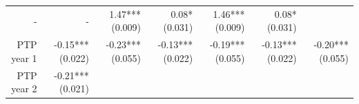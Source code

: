 \documentclass[]{article}
\begin{document}
\begin{longtable}[c]{@{}rrrrrrr@{}}
\begin{minipage}[t]{0.11\columnwidth}\raggedleft\strut
-
\strut\end{minipage} &
\begin{minipage}[t]{0.12\columnwidth}\raggedleft\strut
-
\strut\end{minipage} &
\begin{minipage}[t]{0.11\columnwidth}\raggedleft\strut
1.47*** (0.009)
\strut\end{minipage} &
\begin{minipage}[t]{0.12\columnwidth}\raggedleft\strut
0.08* (0.031)
\strut\end{minipage} &
\begin{minipage}[t]{0.11\columnwidth}\raggedleft\strut
1.46*** (0.009)
\strut\end{minipage} &
\begin{minipage}[t]{0.11\columnwidth}\raggedleft\strut
0.08* (0.031)
\strut\end{minipage}\tabularnewline
\begin{minipage}[t]{0.12\columnwidth}\raggedleft\strut
PTP year 1
\strut\end{minipage} &
\begin{minipage}[t]{0.11\columnwidth}\raggedleft\strut
-0.15*** (0.022)
\strut\end{minipage} &
\begin{minipage}[t]{0.12\columnwidth}\raggedleft\strut
-0.23*** (0.055)
\strut\end{minipage} &
\begin{minipage}[t]{0.11\columnwidth}\raggedleft\strut
-0.13*** (0.022)
\strut\end{minipage} &
\begin{minipage}[t]{0.12\columnwidth}\raggedleft\strut
-0.19*** (0.055)
\strut\end{minipage} &
\begin{minipage}[t]{0.11\columnwidth}\raggedleft\strut
-0.13*** (0.022)
\strut\end{minipage} &
\begin{minipage}[t]{0.11\columnwidth}\raggedleft\strut
-0.20*** (0.055)
\strut\end{minipage}\tabularnewline
\begin{minipage}[t]{0.12\columnwidth}\raggedleft\strut
PTP year 2
\strut\end{minipage} &
\begin{minipage}[t]{0.11\columnwidth}\raggedleft\strut
-0.21*** (0.021)
\strut\end{minipage} &

\end{longtable}
\end{document}
